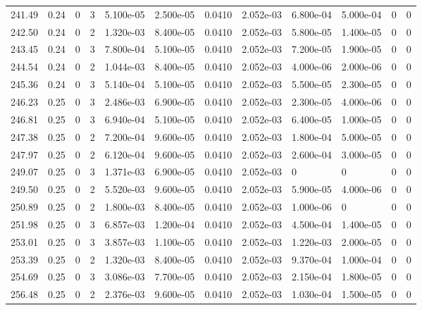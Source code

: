 \documentclass[preview]{standalone}
\begin{document}
{{{{{{{{{{\begin{tabular}{L{1.2cm}C{1.2cm} C{0.3cm}C{0.5cm} C{1.4cm}C{1.4cm} C{1.4cm}C{1.4cm} C{1.6cm}C{1.6cm} C{1.6cm}C{1.6cm}}
  241.49  &  0.24  & 0     &  3 &  5.100e-05  & 2.500e-05  &  0.0410&   2.052e-03& 6.800e-04 & 5.000e-04   &  0 & 0  \\ 
  242.50  &  0.24  & 0     &  2 &  1.320e-03  & 8.400e-05  &  0.0410&   2.052e-03& 5.800e-05 & 1.400e-05   &  0 & 0  \\ 
  243.45  &  0.24  & 0     &  3 &  7.800e-04  & 5.100e-05  &  0.0410&   2.052e-03& 7.200e-05 & 1.900e-05   &  0 & 0  \\ 
  244.54  &  0.24  & 0     &  2 &  1.044e-03  & 8.400e-05  &  0.0410&   2.052e-03& 4.000e-06 & 2.000e-06   &  0 & 0  \\ 
  245.36  &  0.24  & 0     &  3 &  5.140e-04  & 5.100e-05  &  0.0410&   2.052e-03& 5.500e-05 & 2.300e-05   &  0 & 0  \\ 
  246.23  &  0.25  & 0     &  3 &  2.486e-03  & 6.900e-05  &  0.0410&   2.052e-03& 2.300e-05 & 4.000e-06   &  0 & 0  \\ 
  246.81  &  0.25  & 0     &  3 &  6.940e-04  & 5.100e-05  &  0.0410&   2.052e-03& 6.400e-05 & 1.000e-05   &  0 & 0  \\ 
  247.38  &  0.25  & 0     &  2 &  7.200e-04  & 9.600e-05  &  0.0410&   2.052e-03& 1.800e-04 & 5.000e-05   &  0 & 0  \\ 
  247.97  &  0.25  & 0     &  2 &  6.120e-04  & 9.600e-05  &  0.0410&   2.052e-03& 2.600e-04 & 3.000e-05   &  0 & 0  \\ 
  249.07  &  0.25  & 0     &  3 &  1.371e-03  & 6.900e-05  &  0.0410&   2.052e-03& 0 & 0   &  0 & 0  \\ 
  249.50  &  0.25  & 0     &  2 &  5.520e-03  & 9.600e-05  &  0.0410&   2.052e-03& 5.900e-05 & 4.000e-06   &  0 & 0  \\ 
  250.89  &  0.25  & 0     &  2 &  1.800e-03  & 8.400e-05  &  0.0410&   2.052e-03& 1.000e-06 & 0   &  0 & 0  \\ 
  251.98  &  0.25  & 0     &  3 &  6.857e-03  & 1.200e-04  &  0.0410&   2.052e-03& 4.500e-04 & 1.400e-05   &  0 & 0  \\ 
  253.01  &  0.25  & 0     &  3 &  3.857e-03  & 1.100e-05  &  0.0410&   2.052e-03& 1.220e-03 & 2.000e-05   &  0 & 0  \\ 
  253.39  &  0.25  & 0     &  2 &  1.320e-03  & 8.400e-05  &  0.0410&   2.052e-03& 9.370e-04 & 1.000e-04   &  0 & 0  \\ 
  254.69  &  0.25  & 0     &  3 &  3.086e-03  & 7.700e-05  &  0.0410&   2.052e-03& 2.150e-04 & 1.800e-05   &  0 & 0  \\ 
  256.48  &  0.25  & 0     &  2 &  2.376e-03  & 9.600e-05  &  0.0410&   2.052e-03& 1.030e-04 & 1.500e-05   &  0 & 0  \\ 

\end{tabular}}}}}}}}}}}
\end{document}
